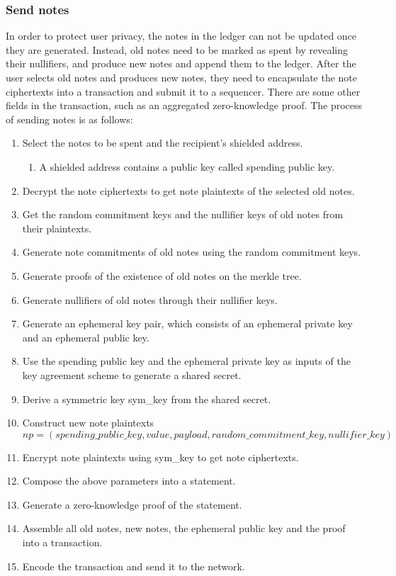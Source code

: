 \subsubsection{Send notes}\label{section: send-notes}

In order to protect user privacy, the notes in the ledger can not be updated once they are generated. Instead, old notes need to be marked as spent by revealing their nullifiers, and produce new notes and append them to the ledger.
After the user selects old notes and produces new notes, they need to encapsulate the note ciphertexts into a transaction and submit it to a sequencer. There are some other fields in the transaction, such as an aggregated zero-knowledge proof. The process of sending notes is as follows:

\begin{enumerate}
    \item Select the notes to be spent and the recipient's shielded address.
    \begin{enumerate}
        \item A shielded address contains a public key called spending public key.
    \end{enumerate}
    \item Decrypt the note ciphertexts to get note plaintexts of the selected old notes.
    \item Get the random commitment keys and the nullifier keys of old notes from their plaintexts.
    \item Generate note commitments of old notes using the random commitment keys.
    \item Generate proofs of the existence of old notes on the merkle tree.
    \item Generate nullifiers of old notes through their nullifier keys.
    \item Generate an ephemeral key pair, which consists of an ephemeral private key and an ephemeral public key.
    \item Use the spending public key and the ephemeral private key as inputs of the key agreement scheme to generate a shared secret.
    \item Derive a symmetric key sym\_key from the shared secret.
    \item Construct new note plaintexts $$np = (spending\_public\_key, value, payload, random\_commitment\_key, nullifier\_key)$$
    \item Encrypt note plaintexts using sym\_key to get note ciphertexts.
    \item Compose the above parameters into a statement.
    \item Generate a zero-knowledge proof of the statement.
    \item Assemble all old notes, new notes, the ephemeral public key and the proof into a transaction.
    \item Encode the transaction and send it to the network.
\end{enumerate}